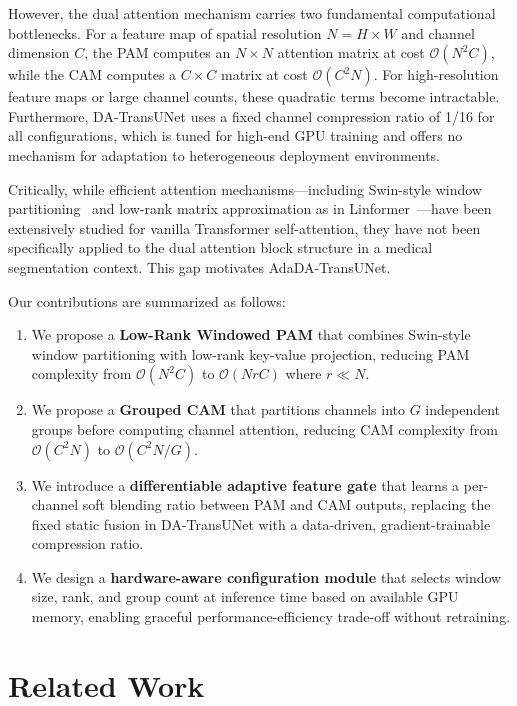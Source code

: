 \documentclass[conference]{IEEEtran}
\begin{document}
However, the dual attention mechanism carries two fundamental computational bottlenecks. For a feature map of spatial resolution $N = H \times W$ and channel dimension $C$, the PAM computes an $N \times N$ attention matrix at cost $\mathcal{O}(N^2 C)$, while the CAM computes a $C \times C$ matrix at cost $\mathcal{O}(C^2 N)$. For high-resolution feature maps or large channel counts, these quadratic terms become intractable. Furthermore, DA-TransUNet uses a fixed channel compression ratio of 1/16 for all configurations, which is tuned for high-end GPU training and offers no mechanism for adaptation to heterogeneous deployment environments.

Critically, while efficient attention mechanisms---including Swin-style window partitioning~\cite{liu2021swin} and low-rank matrix approximation as in Linformer~\cite{wang2020linformer}---have been extensively studied for vanilla Transformer self-attention, they have not been specifically applied to the dual attention block structure in a medical segmentation context. This gap motivates AdaDA-TransUNet.

Our contributions are summarized as follows:
\begin{enumerate}
    \item We propose a \textbf{Low-Rank Windowed PAM} that combines Swin-style window partitioning with low-rank key-value projection, reducing PAM complexity from $\mathcal{O}(N^2 C)$ to $\mathcal{O}(N r C)$ where $r \ll N$.
    \item We propose a \textbf{Grouped CAM} that partitions channels into $G$ independent groups before computing channel attention, reducing CAM complexity from $\mathcal{O}(C^2 N)$ to $\mathcal{O}(C^2 N / G)$.
    \item We introduce a \textbf{differentiable adaptive feature gate} that learns a per-channel soft blending ratio between PAM and CAM outputs, replacing the fixed static fusion in DA-TransUNet with a data-driven, gradient-trainable compression ratio.
    \item We design a \textbf{hardware-aware configuration module} that selects window size, rank, and group count at inference time based on available GPU memory, enabling graceful performance-efficiency trade-off without retraining.
\end{enumerate}


\section{Related Work}
\end{document}
